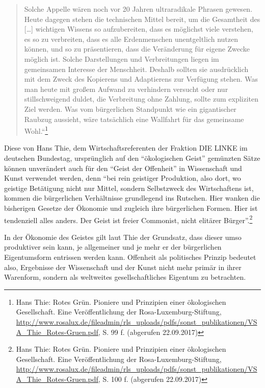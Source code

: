 \documentclass[a4paper,
fontsize=11pt,
oneside,
numbers=noperiodatend,
parskip=half-,
bibliography=totoc,
final
]{scrartcl}
\begin{document}
\begin{quote}
Solche Appelle wären noch vor 20 Jahren ultraradikale Phrasen gewesen.
Heute dagegen stehen die technischen Mittel bereit, um die Gesamtheit
des {[}\ldots{}{]} wichtigen Wissens so aufzubereiten, dass es möglichst
viele verstehen, es so zu verbreiten, dass es alle Erdenmenschen
unentgeltlich nutzen können, und so zu präsentieren, dass die
Veränderung für eigene Zwecke möglich ist. Solche Darstellungen und
Verbreitungen liegen im gemeinsamen Interesse der Menschheit. Deshalb
sollten sie ausdrücklich mit dem Zweck des Kopierens und Adaptierens zur
Verfügung stehen. Was man heute mit großem Aufwand zu verhindern
versucht oder nur stillschweigend duldet, die Verbreitung ohne Zahlung,
sollte zum expliziten Ziel werden. Was vom bürgerlichen Standpunkt wie
ein gigantischer Raubzug aussieht, wäre tatsächlich eine Wallfahrt für
das gemeinsame Wohl.``\footnote{Hans Thie: Rotes Grün. Pioniere und
  Prinzipien einer ökologischen Gesellschaft. Eine Veröffentlichung der
  Rosa-Luxemburg-Stiftung,
  \url{http://www.rosalux.de/fileadmin/rls_uploads/pdfs/sonst_publikationen/VSA_Thie_Rotes-Gruen.pdf},
  S. 99 f. (abgerufen 22.09.2017)}
\end{quote}

Diese von Hans Thie, dem Wirtschaftsreferenten der Fraktion DIE LINKE im
deutschen Bundestag, ursprünglich auf den \enquote{ökologischen Geist}
gemünzten Sätze können unverändert auch für den \enquote{Geist der
Offenheit} in Wissenschaft und Kunst verwendet werden, denn \enquote{bei
rein geistiger Produktion, also dort, wo geistige Betätigung nicht nur
Mittel, sondern Selbstzweck des Wirtschaftens ist, kommen die
bürgerlichen Verhältnisse grundlegend ins Rutschen. Hier wanken die
bisherigen Gesetze der Ökonomie und zugleich ihre bürgerlichen Formen.
Hier ist tendenziell alles anders. Der Geist ist freier Commonist, nicht
elitärer Bürger}.\footnote{Hans Thie: Rotes Grün. Pioniere und
  Prinzipien einer ökologischen Gesellschaft. Eine Veröffentlichung der
  Rosa-Luxemburg-Stiftung,
  \url{http://www.rosalux.de/fileadmin/rls_uploads/pdfs/sonst_publikationen/VSA_Thie_Rotes-Gruen.pdf},
  S. 100 f. (abgerufen 22.09.2017)}

In der Ökonomie des Geistes gilt laut Thie der Grundsatz, dass dieser
umso produktiver sein kann, je allgemeiner und je mehr er der
bürgerlichen Eigentumsform entrissen werden kann. Offenheit als
politisches Prinzip bedeutet also, Ergebnisse der Wissenschaft und der
Kunst nicht mehr primär in ihrer Warenform, sondern als weltweites
gesellschaftliches Eigentum zu betrachten.
\end{document}
